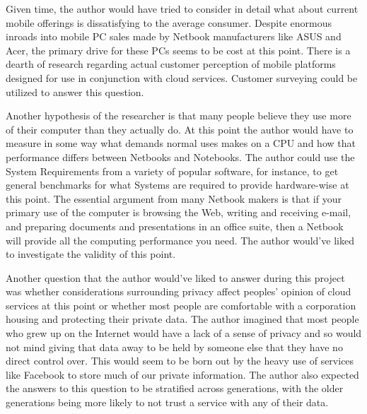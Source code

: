 

Given time, the author would have tried to consider in detail what about current
mobile offerings is dissatisfying to the average consumer.  Despite enormous
inroads into mobile PC sales made by Netbook manufacturers like ASUS and Acer,
the primary drive for these PCs seems to be cost at this
point\citep{gladstone09}.  There is a dearth of research regarding actual
customer perception of mobile platforms designed for use in conjunction with
cloud services.  Customer surveying could be utilized to answer this question.

Another hypothesis of the researcher is that many people believe they use more
of their computer than they actually do.  At this point the author would have to
measure in some way what demands normal uses makes on a CPU and how that
performance differs between Netbooks and Notebooks.  The author could use the
System Requirements from a variety of popular software, for instance, to get
general benchmarks for what Systems are required to provide hardware-wise at
this point.  The essential argument from many Netbook makers is that if your
primary use of the computer is browsing the Web, writing and receiving e-mail,
and preparing documents and presentations in an office suite, then a Netbook
will provide all the computing performance you need.  The author would've liked
to investigate the validity of this point.

Another question that the author would've liked to answer during this project
was whether considerations surrounding privacy affect peoples' opinion of cloud
services at this point or whether most people are comfortable with a corporation
housing and protecting their private data.  The author imagined that most people
who grew up on the Internet would have a lack of a sense of privacy and so would
not mind giving that data away to be held by someone else that they have no
direct control over.  This would seem to be born out by the heavy use of
services like Facebook to store much of our private information.  The author
also expected the answers to this question to be stratified across generations,
with the older generations being more likely to not trust a service with any of
their data.


